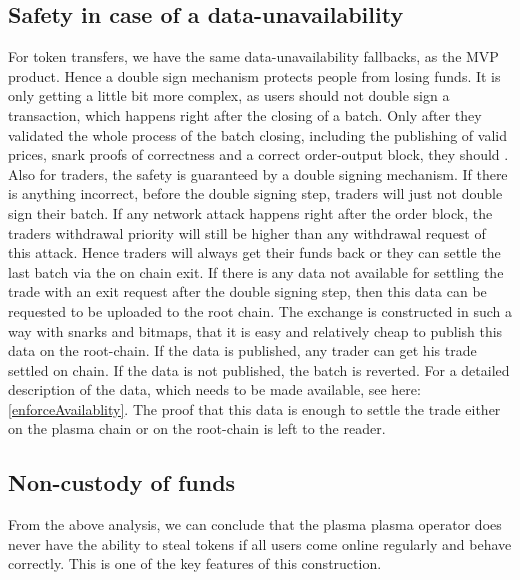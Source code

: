 \documentclass[11pt,parskip=full]{scrartcl}%
\begin{document}
\subsection{Safety in case of a data-unavailability}
For token transfers, we have the same data-unavailability fallbacks, as the MVP product. 
Hence a double sign mechanism protects people from losing funds. 
It is only getting a little bit more complex, as users should not double sign a transaction, which happens right after the closing of a batch.
Only after they validated the whole process of the batch closing, including the publishing of valid prices, snark proofs of correctness and a correct order-output block, they should . \newline
Also for traders, the safety is guaranteed by a  double signing mechanism. 
If there is anything incorrect, before the double signing step, traders will just not double sign their batch. 
If any network attack happens right after the order block, the traders withdrawal priority will still be higher than any withdrawal request of this attack. Hence traders will always get their funds back or they can settle the last batch via the on chain exit. 
If there is any data not available for settling the trade with an exit request after the double signing step, then this data can be requested to be uploaded to the root chain. 
The exchange is constructed in such a way with snarks and bitmaps, that it is easy and relatively cheap to publish this data on the root-chain. 
If the data is published, any trader can get his trade settled on chain. If the data is not published, the batch is reverted. 
For a detailed description of the data, which needs to be made available, see here: \ref{enforceAvailablity}. 
The proof that this data is enough to settle the trade either on the plasma chain or on the root-chain is left to the reader. 

\subsection{Non-custody of funds}
From the above analysis, we can conclude that the plasma plasma operator does never have the ability to steal tokens if all users come online regularly and behave correctly. 
This is one of the key features of this construction. 
\end{document}
